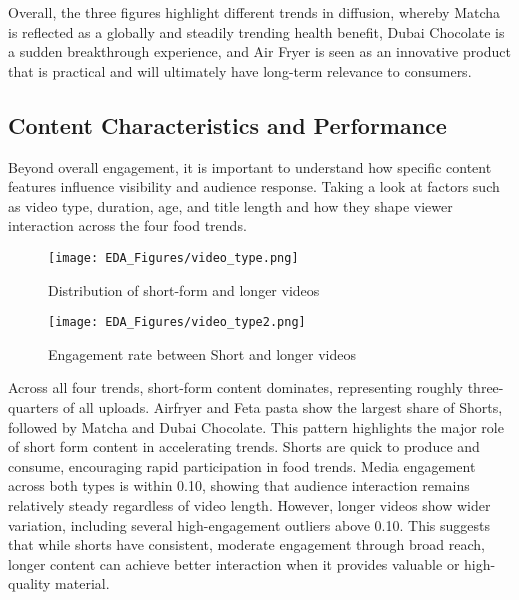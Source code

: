 \documentclass{article}
\begin{document}
Overall, the three figures highlight different trends in diffusion, whereby Matcha is reflected as a globally and steadily trending health benefit, Dubai Chocolate is a sudden breakthrough experience, and Air Fryer is seen as an innovative product that is practical and will ultimately have long-term relevance to consumers.


\subsection{Content Characteristics and Performance}
Beyond overall engagement, it is important to understand how specific content features influence visibility and audience response. Taking a look at factors such as video type, duration, age, and title length and how they shape viewer interaction across the four food trends.

\begin{figure}[H]
    \centering
    \begin{minipage}[t]{0.48\textwidth}
        \centering
        \texttt{[image: EDA\_Figures/video\_type.png]}
        \caption{Distribution of short-form and longer videos}
        \label{fig:video_type}
    \end{minipage}
    \hfill
    \begin{minipage}[t]{0.48\textwidth}
        \centering
        \texttt{[image: EDA\_Figures/video\_type2.png]}
        \caption{Engagement rate between Short and longer videos}
        \label{fig:video_type2}
    \end{minipage}
\end{figure}

Across all four trends, short-form content dominates, representing roughly three-quarters of all uploads. Airfryer and Feta pasta show the largest share of Shorts, followed by Matcha and Dubai Chocolate. This pattern highlights the major role of short form content in accelerating trends. Shorts are quick to produce and consume, encouraging rapid participation in food trends. Media engagement across both types is within 0.10, showing that audience interaction remains relatively steady regardless of video length. However, longer videos show wider variation, including several high-engagement outliers above 0.10. This suggests that while shorts have consistent, moderate engagement through broad reach, longer content can achieve better interaction when it provides valuable or high-quality material. 
\end{document}
